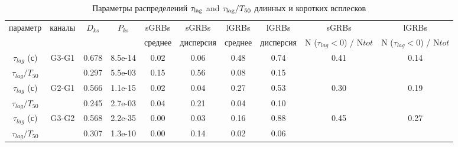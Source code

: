 \begin{table} [h]
 \centering
 \caption{Параметры распределений $\tau_{{\mathrm{lag}}}$ and $\tau_{{\mathrm{lag}}}/T_{50}$ 
 длинных и коротких всплесков}\label{tab:LagDist}
\scriptsize
  \begin{center}
  \begin{tabular}{c c c c c c c c c c}
  \hline
  \hline
параметр & каналы & $D_{ks}$ &  $P_{ks}$ 
& sGRBs & sGRBs & lGRBs & lGRBs & sGRBs & lGRBs \\
         &        &          &           
& среднее &  дисперсия   &  среднее &  дисперсия  & N ($\tau_{lag}<0$) / N${tot}$ & N ($\tau_{lag}<0$) / N${tot}$\\
\hline
$\tau_{lag}$ (с)    & G3-G1 &	0.678 &	8.5e-14 &	0.02 &	0.06 &	0.48 &	0.74 &	0.41 & 0.14\\
$\tau_{lag}/T_{50}$ &	    &   0.297 & 5.5e-03	&   0.15 &	0.56 &	0.08 & 	0.15 &		 &     \\
$\tau_{lag}$ (с)    & G2-G1 &   0.566 &	1.1e-15	&   0.02 &	0.04 &	0.27 &	0.53 &	0.30 & 0.19 \\
$\tau_{lag}/T_{50}$ & 	    &   0.245 &	2.7e-03	&   0.04 &	0.21 &	0.04 &	0.10 &	 &	\\	
$\tau_{lag}$ (с)    & G3-G2 &	0.568 & 2.2e-35	&   0.00 &	0.03 &	0.16 &	0.88 &	0.45 &	0.27 \\
$\tau_{lag}/T_{50}$ &       &	0.307 & 1.3e-10	&   0.00 &	0.14 &	0.02 &	0.06 &		 &	\\
\hline
\end{tabular}
\end{center}
\end{table}